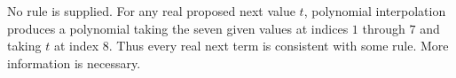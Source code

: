 No rule is supplied. For any real proposed next value $t$, polynomial interpolation produces a polynomial taking the seven given values at indices $1$ through $7$ and taking $t$ at index $8$. Thus every real next term is consistent with some rule. More information is necessary.
